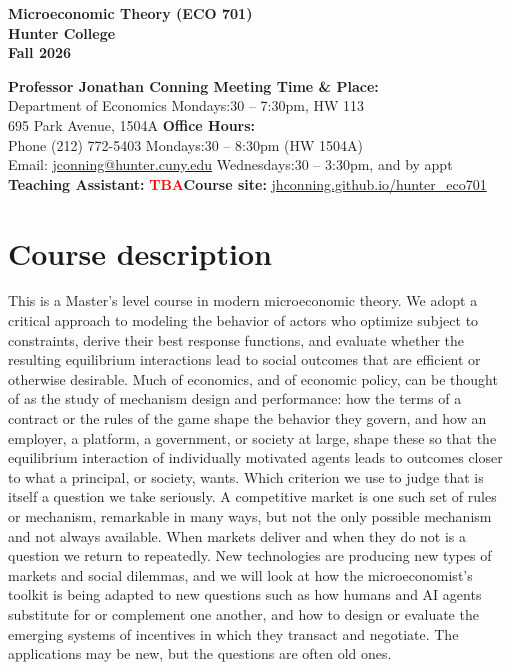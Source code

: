 \documentclass[11pt]{article}
\newcommand{\TBD}{\textcolor{red}{\textbf{TBA}}}
\begin{document}
\begin{center}
\begin{Large}
\textbf{
Microeconomic Theory (ECO 701) \\
Hunter College \\
Fall 2026\\
}
\end{Large}
\end{center}

\textbf{Professor Jonathan Conning \hfill Meeting Time \& Place:} \\
Department of Economics \hfill Mondays:30 -- 7:30pm, HW 113 \\
695 Park Avenue, 1504A \hfill \textbf{Office Hours:} \\
Phone (212) 772-5403 \hfill Mondays:30 -- 8:30pm (HW 1504A) \\
Email: {\href{mailto:jconning@hunter.cuny.edu}{jconning@hunter.cuny.edu}} \hfill Wednesdays:30 -- 3:30pm, and by appt \\
\textbf{Teaching Assistant:} \TBD \hfill \textbf{Course site:} \href{https://jhconning.github.io/hunter_eco701/}{jhconning.github.io/hunter\_eco701}

\setlength{\parskip}{12pt}

\section{Course description}
This is a Master's level course in modern microeconomic theory. We adopt a critical approach to modeling the
behavior of actors who optimize subject to constraints, derive their best
response functions, and evaluate whether the resulting equilibrium interactions
lead to social outcomes that are efficient or otherwise desirable. Much of
economics, and of economic policy, can be thought of as the study of mechanism design and performance: how the terms of a contract or the rules of the game shape the behavior they govern, and how an employer, a platform, a government, or society at large, shape these so that the equilibrium interaction of individually motivated agents leads to outcomes closer to what a principal, or society, wants. Which criterion we use to judge that is itself a question we take seriously. A competitive market is one such set of rules or mechanism, remarkable in many ways, but not the only possible mechanism and not always available. When markets deliver and when they do not is a question we return to repeatedly. New technologies are producing new types of markets and social dilemmas, and we will look at how the microeconomist's toolkit is being adapted to new questions such as how humans and AI agents substitute for or complement one another, and how to design or evaluate the emerging systems of incentives in which they transact and negotiate. The applications may be new, but the questions are often old ones.
\end{document}
